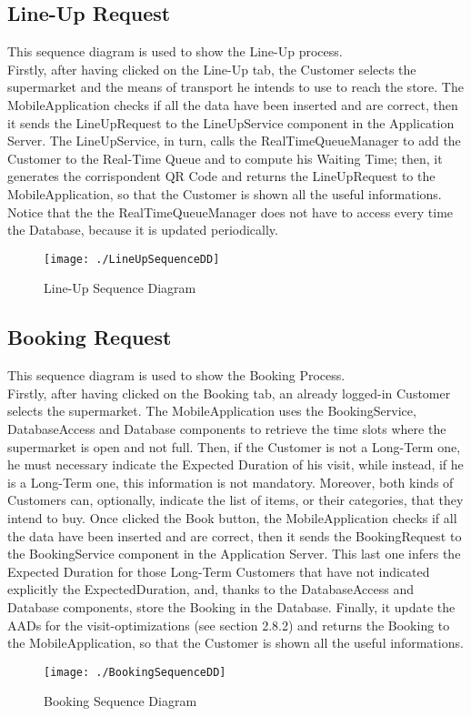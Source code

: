 \subsection{Line-Up Request}
This sequence diagram is used to show the Line-Up process. \\
Firstly, after having clicked on the Line-Up tab, the Customer selects the supermarket and the means of transport he intends to use to reach the store. The MobileApplication checks if all the data have been inserted and are correct, then it sends the LineUpRequest to the LineUpService component in the Application Server. The LineUpService, in turn, calls the RealTimeQueueManager to add the Customer to the Real-Time Queue and to compute his Waiting Time; then, it generates the corrispondent QR Code and returns the LineUpRequest to the MobileApplication, so that the Customer is shown all the useful informations. \\
Notice that the the RealTimeQueueManager does not have to access every time the Database, because it is updated periodically.
\begin{figure}[H]
\centerline{\texttt{[image: ./LineUpSequenceDD]}}
\caption{Line-Up Sequence Diagram}
\end{figure}


\subsection{Booking Request}
This sequence diagram is used to show the Booking Process.\\
Firstly, after having clicked on the Booking tab, an already logged-in Customer selects the supermarket. The MobileApplication uses the BookingService, DatabaseAccess and Database components to retrieve the time slots where the supermarket is open and not full. Then, if the Customer is not a Long-Term one, he must necessary indicate the Expected Duration of his visit, while instead, if he is a Long-Term one, this information is not mandatory.
Moreover, both kinds of Customers can, optionally, indicate the list of items, or their categories, that they intend to buy. Once clicked the Book button, the MobileApplication checks if all the data have been inserted and are correct, then it sends the BookingRequest to the BookingService component in the Application Server. This last one infers the Expected Duration for those Long-Term Customers that have not indicated explicitly the ExpectedDuration, and, thanks to the DatabaseAccess and Database components, store the Booking in the Database. Finally, it update the AADs for the visit-optimizations (see section 2.8.2) and returns the Booking to the MobileApplication, so that the Customer is shown all the useful informations.
\begin{figure}[H]
\centerline{\texttt{[image: ./BookingSequenceDD]}}
\caption{Booking Sequence Diagram}
\end{figure}


